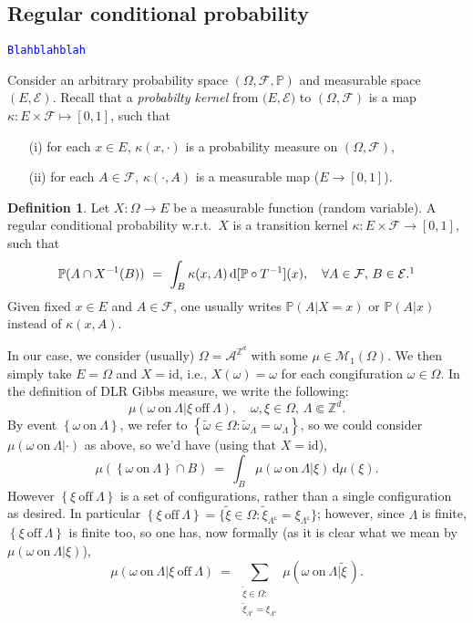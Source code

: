 \documentclass[12pt]{article}
\newcommand{\A}{\mathcal{A}}
\renewcommand{\d}{\mathrm{d}}
\newcommand{\F}{\mathcal{F}}
\newcommand{\M}{\mathcal{M}}
\renewcommand{\P}{\mathbb{P}}
\newcommand{\Z}{\mathbb{Z}}
\newcommand{\set}[1]{\left\{#1\right\}}
\newcommand{\ra}{\rightarrow}
\newcommand{\pika}{\boldsymbol{\cdot}}
\newcommand{\1}{\mathbbm{1}}
\renewcommand{\c}{\mathsf{c}}
\newcommand{\5}{\vspace{0.5cm}}
\renewcommand{\tilde}{\widetilde}
\theoremstyle{definition}
\newtheorem{df}[thm]{Definition}
\begin{document}

\subsection{Regular conditional probability }

\textcolor{blue}{\texttt{Blahblahblah}} %

Consider an arbitrary probability space $(\Omega,\F,\P)$ and measurable space $(E,\mathcal{E})$. Recall that a \textit{probabilty kernel} from $(E,\mathcal{E)}$ to $(\Omega,\F)$ is a map $\kappa:E\times\F\mapsto[0,1]$, such that
\begin{itemize}
	\item[(i)] for each $x\in E$, $\kappa(x,\pika)$ is a probability measure on $(\Omega,\F)$,
	\item[(ii)] for each $A\in\F$, $\kappa(\pika,A)$ is a measurable map ($E\ra[0,1]$).
\end{itemize}

\begin{df}
Let $X:\Omega\ra E$ be a measurable function (random variable). A regular conditional probability w.r.t.~$X$ is a transition kernel $\kappa:E\times\F\ra[0,1]$, such that
$$\P(A\cap X^{-1}(B)) ~=~ \int_B \kappa(x,A)\,\d[\P\circ T^{-1}](x), \quad \forall A\in\F,\,B\in\mathcal{E}.\footnote{Instead of $\P(A\cap X^{-1}(B))$, one could also write $\P(A\cap\set{X\in B)}$ or $\P(A~\text{and}~X\in B)$.}$$ 
Given fixed $x\in E$ and $A\in\F$, one usually writes $\P(A|X=x)$ or $\P(A|x)$ instead of $\kappa(x,A)$.
\end{df}

In our case, we consider (usually) $\Omega=\A^{\Z^d}$ with some $\mu\in\M_1(\Omega)$. We then simply take $E=\Omega$ and $X=\mathrm{id}$, i.e., $X(\omega)=\omega$ for each congifuration $\omega\in\Omega$. In the definition of DLR Gibbs measure, we write the following:
$$\mu(\omega~\text{on}~\Lambda|\xi~\text{off}~\Lambda),\quad \omega,\xi\in\Omega,\,\Lambda\Subset\Z^d.$$
By event $\set{\omega~\text{on}~\Lambda}$, we refer to $\set{\tilde{\omega}\in\Omega:\tilde{\omega}_\Lambda=\omega_\Lambda}$, so we could consider $\mu(\omega~\text{on}~\Lambda|\pika)$ as above, so we'd have (using that $X=\mathrm{id}$),
$$\mu(\set{\omega~\text{on}~\Lambda}\cap B) ~=~ \int_B \mu(\omega~\text{on}~\Lambda|\xi)\,\d\mu(\xi).$$
However $\set{\xi~\text{off}~\Lambda}$ is a set of configurations, rather than a single configuration as desired. In particular $\set{\xi~\text{off}~\Lambda}=\{\tilde{\xi}\in\Omega:\tilde{\xi}_{\Lambda^\c}=\xi_{\Lambda^\c}\}$; however, since $\Lambda$ is finite, $\set{\xi~\text{off}~\Lambda}$ is finite too, so one has, now formally (as it is clear what we mean by $\mu(\omega~\text{on}~\Lambda|\xi)$),
$$\mu(\omega~\text{on}~\Lambda|\xi~\text{off}~\Lambda) ~=~ \sum_{\substack{\tilde{\xi}\in\Omega:\\\tilde{\xi}_{\Lambda^\c}=\xi_{\Lambda^\c}}}\mu(\omega~\text{on}~\Lambda|\tilde{\xi}\,).$$ 
\end{document}
